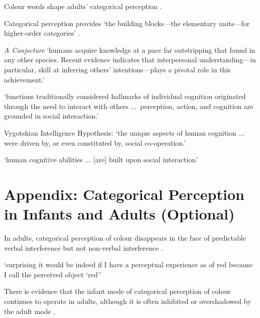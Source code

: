 \documentclass[12pt]{extarticle}
\begin{document}
\begin{multicols}{3}
Colour words shape adults’ categorical perception \citep{Roberson:2007wg,Winawer:2007im}.

Categorical perception provides ‘the building blocks—the elementary units—for higher-order categories’
\citep[p.\ 3]{Harnad:1987ej}.

\emph{A Conjecture}
‘humans acquire knowledge at a pace far outstripping that found in any other species.
Recent evidence indicates that interpersonal understanding—in particular, skill at
inferring others’ intentions—plays a pivotal role in this achievement.’
\citep[p.\ 40]{Baldwin:2000qq}

‘functions traditionally considered hallmarks of individual cognition originated through the need to interact with others ...\ perception, action, and cognition are grounded in social interaction.’
\citep[p.\ 103]{Knoblich:2006bn}

Vygotskian Intelligence Hypothesis:
‘the unique aspects of human cognition ... were driven by, or even constituted by, social co-operation.’
\citep[p.\ 1]{Moll:2007gu}

‘human cognitive abilities ... [are] built upon social interaction’
\citep{sinigaglia:2008_roots} %



\section{Appendix: Categorical Perception in Infants and Adults (Optional)}

In adults, categorical perception of colour disappears in the face of predictable verbal interference but not non-verbal interference
\citep{Roberson:2000ge,Pilling:2003bi,Wiggett:2008xt}.

‘surprising it would be indeed if I have a perceptual experience as of red because I call the perceived object ‘red’’
\citep[pp.\ 324--5]{Stokes:2006fd}

There is evidence that the infant mode of categorical perception of colour continues to operate in adults, although it is often inhibited or overshadowed by the adult mode \citep{Gilbert:2006yb}.





\footnotesize


\end{multicols}
\end{document}
